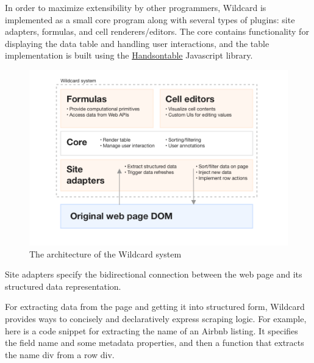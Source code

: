 \documentclass[english,submission]{programming}
\newenvironment{Shaded}{}{}
\newcommand{\FunctionTok}[1]{\textcolor[rgb]{0.02,0.16,0.49}{#1}}
\newcommand{\KeywordTok}[1]{\textcolor[rgb]{0.00,0.44,0.13}{\textbf{#1}}}
\newcommand{\NormalTok}[1]{#1}
\newcommand{\OperatorTok}[1]{\textcolor[rgb]{0.40,0.40,0.40}{#1}}
\newcommand{\SpecialCharTok}[1]{\textcolor[rgb]{0.25,0.44,0.63}{#1}}
\newcommand{\StringTok}[1]{\textcolor[rgb]{0.25,0.44,0.63}{#1}}
\newcommand{\VariableTok}[1]{\textcolor[rgb]{0.10,0.09,0.49}{#1}}
\newcommand{\VerbatimStringTok}[1]{\textcolor[rgb]{0.25,0.44,0.63}{#1}}
\begin{document}
In order to maximize extensibility by other programmers, Wildcard is
implemented as a small core program along with several types of plugins:
site adapters, formulas, and cell renderers/editors. The core contains
functionality for displaying the data table and handling user
interactions, and the table implementation is built using the
\href{https://handsontable.com/}{Handsontable} Javascript library.

\begin{figure}
\centering
\includegraphics{media/architecture-clean.png}
\caption{The architecture of the Wildcard system}
\end{figure}

Site adapters specify the bidirectional connection between the web page
and its structured data representation.

For extracting data from the page and getting it into structured form,
Wildcard provides ways to concisely and declaratively express scraping
logic. For example, here is a code snippet for extracting the name of an
Airbnb listing. It specifies the field name and some metadata
properties, and then a function that extracts the name div from a row
div.

\begin{Shaded}
\end{Shaded}
\end{document}
